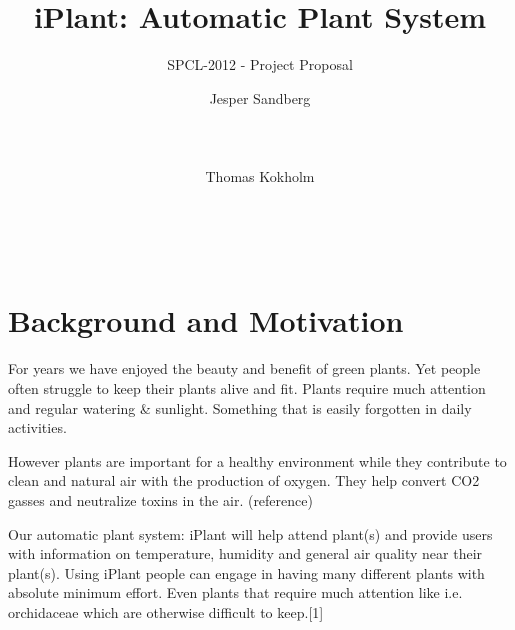 \documentclass{ubicomp2012}
\begin{document}
\setlength{\paperheight}{11in}
\setlength{\paperwidth}{8.5in}
\setlength{\pdfpageheight}{\paperheight}
\setlength{\pdfpagewidth}{\paperwidth}




\title{iPlant: Automatic Plant System}
\subtitle{SPCL-2012 - Project Proposal}
\author{
  \alignauthor Jesper Sandberg\\
    \\
    \\
    \\
 \alignauthor Thomas Kokholm\\
    \\
    \\
    \\
      }
\maketitle

\section{Background and Motivation}
For years we have enjoyed the beauty and benefit of green plants. Yet people often struggle to keep their plants alive and fit. Plants require much attention and regular watering \& sunlight. Something that is easily forgotten in daily activities.



However plants are important for a healthy environment while they contribute to clean and natural air with the production of oxygen.
They help convert CO2 gasses and neutralize toxins in the air. (reference)

Our automatic plant system: iPlant will help attend plant(s) and provide users with information on temperature, humidity and general air quality near their plant(s). Using iPlant people can engage in having many different plants with absolute minimum effort. Even plants that require much attention like i.e. orchidaceae which are otherwise difficult to keep.[1]
\end{document}
